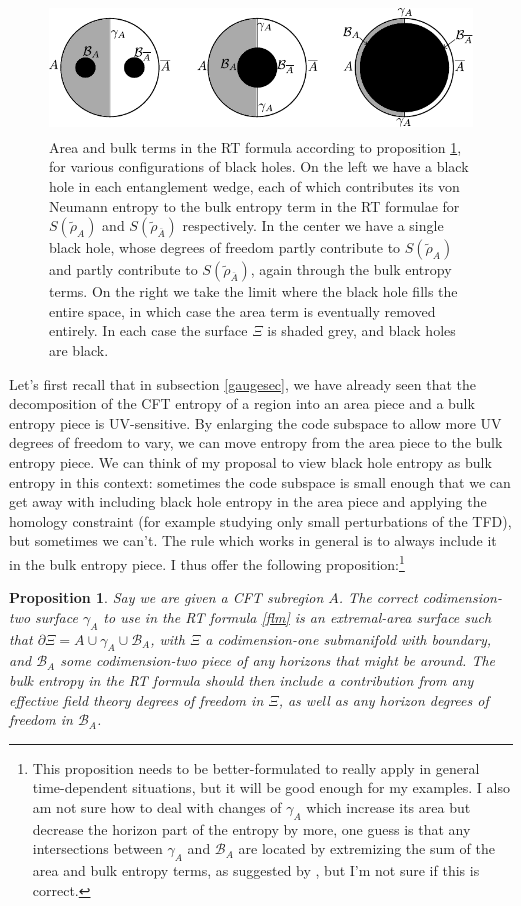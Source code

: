 \documentclass[12pt]{article}
\newcommand{\bfig}{\begin{figure}\begin{center}}
\newcommand{\efig}{\end{center}\end{figure}}
\newcommand{\wt}{\widetilde}
\newcommand{\Ab}{\ol{A}}
\newcommand{\ol}{\overline}
\newtheorem{prop}{Proposition}[section]
\begin{document}
\bfig
\includegraphics[height=3.5cm]{blackholes.pdf}
\caption{Area and bulk terms in the RT formula according to proposition \ref{bhprop}, for various configurations of black holes.  On the left we have a black hole in each entanglement wedge, each of which contributes its von Neumann entropy to the bulk entropy term in the RT formulae for $S(\wt{\rho}_A)$ and $S(\wt{\rho}_{\Ab})$ respectively.  In the center we have a single black hole, whose degrees of freedom partly contribute to $S(\wt{\rho}_A)$ and partly contribute to $S(\wt{\rho}_{\Ab})$, again through the bulk entropy terms. On the right we take the limit where the black hole fills the entire space, in which case the area term is eventually removed entirely.  In each case the surface $\Xi$ is shaded grey, and black holes are black.}\label{bhfig}
\efig
Let's first recall that in subsection \ref{gaugesec}, we have already seen that the decomposition of the CFT entropy of a region into an area piece and a bulk entropy piece is UV-sensitive.  By enlarging the code subspace to allow more UV degrees of freedom to vary, we can move entropy from the area piece to the bulk entropy piece.  We can think of my proposal to view black hole entropy as bulk entropy in this context: sometimes the code subspace is small enough that we can get away with including black hole entropy in the area piece and applying the homology constraint (for example studying only small perturbations of the TFD), but sometimes we can't.  The rule which works in general is to always include it in the bulk entropy piece.  I thus offer the following proposition:\footnote{This proposition needs to be better-formulated to really apply in general time-dependent situations, but it will be good enough for my examples.  I also am not sure how to deal with changes of $\gamma_A$ which increase its area but decrease the horizon part of the entropy by more, one guess is that any intersections between $\gamma_A$ and $\mathcal{B}_A$ are located by extremizing the sum of the area and bulk entropy terms, as suggested by \cite{Engelhardt:2014gca}, but I'm not sure if this is correct.}
\begin{prop}\label{bhprop}
Say we are given a CFT subregion $A$.  The correct codimension-two surface $\gamma_A$ to use in the RT formula \eqref{flm} is an extremal-area surface such that $\partial \Xi=A \cup \gamma_A \cup \mathcal{B}_A$, with $\Xi$ a codimension-one submanifold with boundary, and $\mathcal{B}_A$ some codimension-two piece of any horizons that might be around.  The bulk entropy in the RT formula should then include a contribution from any effective field theory degrees of freedom in $\Xi$, as well as any horizon degrees of freedom in $\mathcal{B}_A$.  
\end{prop}
\end{document}
